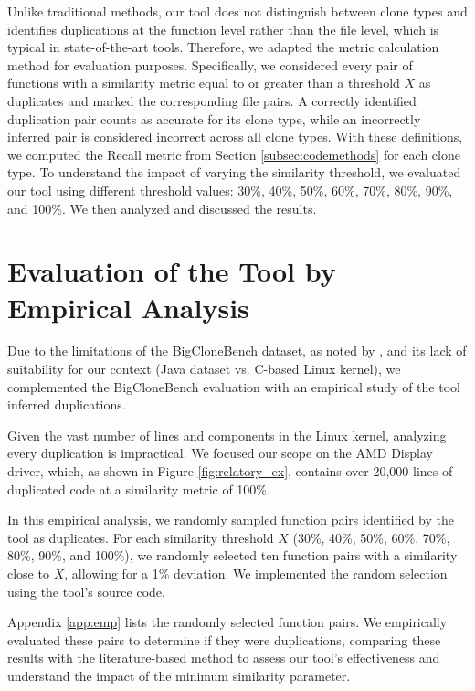 Unlike traditional methods, our tool does not distinguish between clone types and identifies duplications at the function level rather than the file level, which is typical in state-of-the-art tools. Therefore, we adapted the metric calculation method for evaluation purposes. Specifically, we considered every pair of functions with a similarity metric equal to or greater than a threshold \(X\) as duplicates and marked the corresponding file pairs. A correctly identified duplication pair counts as accurate for its clone type, while an incorrectly inferred pair is considered incorrect across all clone types. With these definitions, we computed the Recall metric from Section \ref{subsec:codemethods} for each clone type.
%
To understand the impact of varying the similarity threshold, we evaluated our tool using different threshold values: 30\%, 40\%, 50\%, 60\%, 70\%, 80\%, 90\%, and 100\%. We then analyzed and discussed the results.

\section{Evaluation of the Tool by Empirical Analysis}

\label{sec:metemp}

Due to the limitations of the BigCloneBench dataset, as noted by \cite{bigfail}, and its lack of suitability 
for our context (Java dataset vs. C-based Linux kernel), we complemented the BigCloneBench evaluation with 
an empirical study of the tool inferred duplications.

Given the vast number of lines and components in the Linux kernel, analyzing every duplication is impractical. We focused our scope on the AMD Display driver, which, as shown in Figure \ref{fig:relatory_ex}, contains over 20,000 lines of duplicated code at a similarity metric of 100\%.

In this empirical analysis, we randomly sampled function pairs identified by the tool as duplicates. For each similarity threshold \(X\) (30\%, 40\%, 50\%, 60\%, 70\%, 80\%, 90\%, and 100\%), we randomly selected ten function pairs with a similarity close to \(X\), allowing for a 1\% deviation. We implemented the random selection using the tool's source code.

Appendix \ref{app:emp} lists the randomly selected function pairs. We empirically evaluated these pairs to determine if they were duplications, comparing these results with the literature-based method to assess our tool's effectiveness and understand the impact of the minimum similarity parameter.

